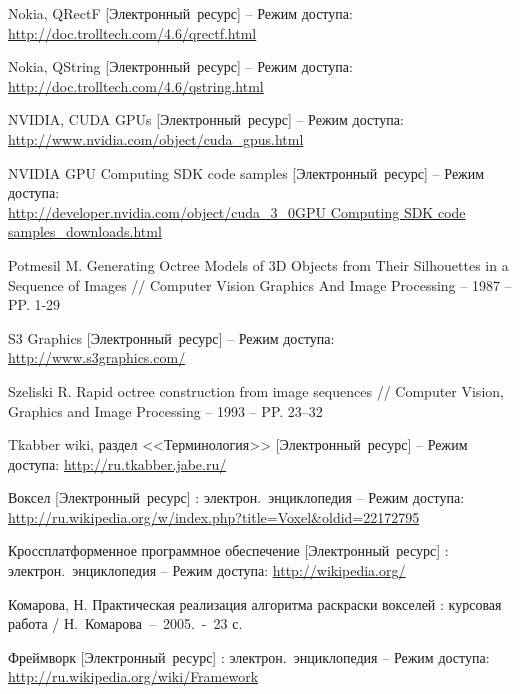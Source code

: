 \begin{thebibliography}{99}
		Nokia, QRectF [Электронный~ресурс]
		-- Режим доступа:
		\url{http://doc.trolltech.com/4.6/qrectf.html}

		Nokia, QString [Электронный~ресурс]
		-- Режим доступа:
		\url{http://doc.trolltech.com/4.6/qstring.html}

		NVIDIA, CUDA GPUs [Электронный~ресурс] -- Режим доступа:\\
		\url{http://www.nvidia.com/object/cuda_gpus.html}

		NVIDIA GPU Computing SDK code samples [Электронный~ресурс] -- Режим доступа:\\
		\url{http://developer.nvidia.com/object/cuda_3_0GPU Computing SDK code samples_downloads.html}

		Potmesil M. Generating Octree Models of 3D Objects from Their Silhouettes in a Sequence of Images // 
		Computer Vision Graphics And Image Processing -- 1987 -- PP. 1-29

		S3 Graphics [Электронный~ресурс] -- Режим доступа:
		\url{http://www.s3graphics.com/}

		Szeliski R. Rapid octree construction from image sequences // 
		Computer Vision, Graphics and Image Processing -- 1993 -- PP. 23–32
	
		Tkabber wiki, раздел <<Терминология>> [Электронный~ресурс] -- Режим доступа:
		\url{http://ru.tkabber.jabe.ru/}
	
		Воксел [Электронный~ресурс] : электрон.~энциклопедия -- Режим доступа: \url{http://ru.wikipedia.org/w/index.php?title=Voxel&oldid=22172795}

		Кроссплатформенное программное обеспечение [Электронный~ресурс] : электрон.~энциклопедия -- Режим доступа:
		\url{http://wikipedia.org/}

		Комарова, Н. Практическая реализация алгоритма раскраски вокселей : курсовая работа / 
		Н.~Комарова~--~2005.~-~23 с.

		Фреймворк [Электронный~ресурс] : электрон.~энциклопедия -- Режим доступа:
		\url{http://ru.wikipedia.org/wiki/Framework}

\end{thebibliography}

